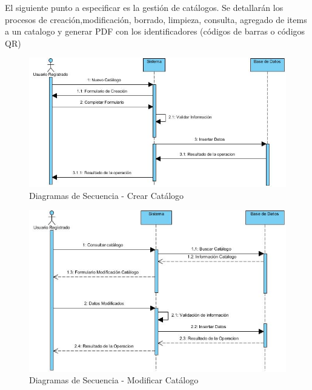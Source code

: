 \documentclass[a4paper,11pt]{book}
\begin{document}
El siguiente punto a especificar es la gestión de catálogos. Se detallarán los procesos de creación,modificación, borrado, limpieza, consulta, agregado de items a un catalogo y generar PDF con los identificadores (códigos de barras o códigos QR)  

\begin{figure}[H] 
\centering 
\includegraphics[scale=0.50]{imagenes/secuencia/Crear_Catalogo.jpg}
\caption{ Diagramas de Secuencia - Crear Catálogo\cite{diagrama}  }  
\end{figure}

\begin{figure}[H] 
\centering 
\includegraphics[scale=0.50]{imagenes/secuencia/Modificar_Catalogo.jpg}
\caption{ Diagramas de Secuencia - Modificar Catálogo\cite{diagrama}  }  
\end{figure}
\end{document}
